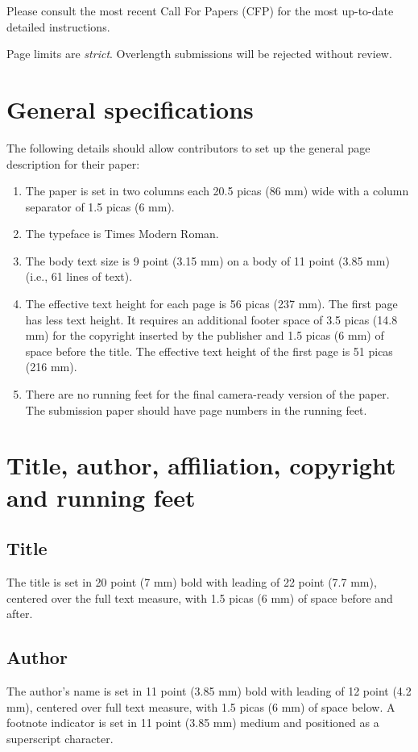 \documentclass{ecai}  %
\begin{document}
Please consult the most recent Call For Papers (CFP) for the most up-to-date
detailed instructions.

Page limits are \textit{strict}. Overlength submissions will be rejected without review.

\section{General specifications}
The following details should allow contributors to set up the general
page description for their paper:

\begin{enumerate}
\item The paper is set in two columns each 20.5 picas (86 mm) wide
  with a column separator of 1.5 picas (6 mm).

\item The typeface is Times Modern Roman.

\item The body text size is 9 point (3.15 mm) on a body of 11
point (3.85 mm) (i.e., 61 lines of text).

\item The effective text height for each page is 56 picas (237 mm).
The first page has less text height. It requires an additional footer
space of 3.5 picas (14.8 mm) for the copyright inserted by the publisher
and 1.5 picas (6 mm) of space before the title.
The effective text height of the first page is 51 picas (216 mm).

\item There are no running feet for the final camera-ready version of the
paper. The submission paper should have page numbers in the running feet.

\end {enumerate}

\section{Title, author, affiliation, copyright
and running feet}
\subsection{Title}
The title is set in 20 point (7 mm) bold with leading of 22 point (7.7
mm), centered over the full text measure, with 1.5 picas (6 mm) of
space before and after.

\subsection{Author}
The author's name is set in 11 point (3.85 mm) bold with leading of 12
point (4.2 mm), centered over full text measure, with 1.5 picas (6 mm)
of space below. A footnote indicator is set in 11 point (3.85 mm)
medium and positioned as a superscript character.
\end{document}
